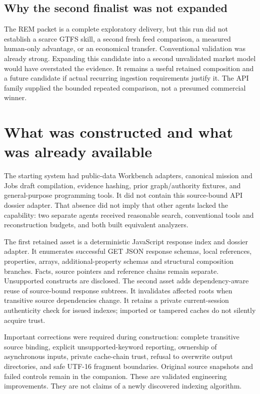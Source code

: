 \documentclass[11pt,letterpaper]{article}
\begin{document}
\subsection{Why the second finalist was not expanded}

The REM packet is a complete exploratory delivery, but this run did not establish a scarce
GTFS skill, a second fresh feed comparison, a measured human-only advantage, or an economical
transfer. Conventional validation was already strong. Expanding this candidate into a second
unvalidated market model would have overstated the evidence. It remains a useful retained
composition and a future candidate if actual recurring ingestion requirements justify it.
The API family supplied the bounded repeated comparison, not a presumed commercial winner.

\section{What was constructed and what was already available}

The starting system had public-data Workbench adapters, canonical mission and Jobs draft
compilation, evidence hashing, prior graph/authority fixtures, and general-purpose programming
tools. It did not contain this source-bound API dossier adapter. That absence did not imply that
other agents lacked the capability: two separate agents received reasonable search, conventional
tools and reconstruction budgets, and both built equivalent analyzers.

The first retained asset is a deterministic JavaScript response index and dossier adapter.
It enumerates successful GET JSON response schemas, local references, properties, arrays,
additional-property schemas and structural composition branches. Facts, source pointers and
reference chains remain separate. Unsupported constructs are disclosed. The second asset
adds dependency-aware reuse of source-bound response subtrees. It invalidates affected roots
when transitive source dependencies change. It retains a private current-session authenticity
check for issued indexes; imported or tampered caches do not silently acquire trust.

Important corrections were required during construction: complete transitive source binding,
explicit unsupported-keyword reporting, ownership of asynchronous inputs, private cache-chain
trust, refusal to overwrite output directories, and safe UTF-16 fragment boundaries. Original
source snapshots and failed controls remain in the companion. These are validated engineering
improvements. They are not claims of a newly discovered indexing algorithm.
\end{document}
